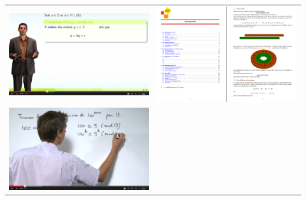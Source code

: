 \begin{frame}
\begin{tabular}{cc}
\includegraphics[scale=0.08]{Fig-crypto/img_video.png} &
\pause
\includegraphics[scale=0.08]{Fig-crypto/img_cours.png} \\
\pause
\includegraphics[scale=0.08]{Fig-crypto/img_exercice.png} &

\end{tabular}
\end{frame}
